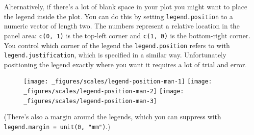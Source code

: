 Alternatively, if there's a lot of blank space in your plot you might
want to place the legend inside the plot. You can do this by setting
\texttt{legend.position} to a numeric vector of length two. The numbers
represent a relative location in the panel area: \texttt{c(0, 1)} is the
top-left corner and \texttt{c(1, 0)} is the bottom-right corner. You
control which corner of the legend the \texttt{legend.position} refers
to with \texttt{legend.justification}, which is specified in a similar
way. Unfortunately positioning the legend exactly where you want it
requires a lot of trial and error.

\begin{Shaded}
\begin{Highlighting}[]
\StringTok{ }\StringTok{ }
\StringTok{  }\NormalTok{(}\NormalTok{(}  \NormalTok{)}

\StringTok{ }\NormalTok{(} \NormalTok{(}\NormalTok{, }\NormalTok{), } \NormalTok{(}\NormalTok{, }\NormalTok{))}
\StringTok{ }\NormalTok{(} \NormalTok{(}\NormalTok{, }\NormalTok{), } \NormalTok{(}\NormalTok{, }\NormalTok{))}
\StringTok{ }\NormalTok{(} \NormalTok{(}\NormalTok{, }\NormalTok{), } \NormalTok{(}\NormalTok{, }\NormalTok{))}
\end{Highlighting}
\end{Shaded}

\begin{figure}[H]
  \texttt{[image: \_figures/scales/legend-position-man-1]}%
  \texttt{[image: \_figures/scales/legend-position-man-2]}%
  \texttt{[image: \_figures/scales/legend-position-man-3]}
\end{figure}

(There's also a margin around the legends, which you can suppress with
\texttt{legend.margin = unit(0, "mm")}.)


